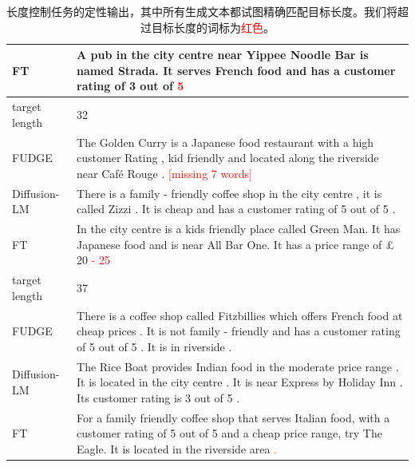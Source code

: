 \documentclass{article}
\newcommand\errorspan[1]{\textcolor{red}{#1}}
\begin{document}
\begin{table}
{\begin{tabular}{lp{13cm}}
FT &  A pub in the city centre near Yippee Noodle Bar is named Strada. It serves French food and has a customer rating of 3 out of \errorspan{ 5 }
\\
\toprule
target length &  32 \\
\midrule
FUDGE &  The Golden Curry is a Japanese food restaurant with a high customer Rating , kid friendly and located along the riverside near Café Rouge . \errorspan{[missing 7 words]}\\
Diffusion-LM &   There is a family - friendly coffee shop in the city centre , it is called Zizzi . It is cheap and has a customer rating of 5 out of 5 . \\
FT &  In the city centre is a kids friendly place called Green Man. It has Japanese food and is near All Bar One. It has a price range of £ 20 \errorspan{ - 25 }
\\
\toprule
target length &  37 \\
\midrule
FUDGE &  There is a coffee shop called Fitzbillies which offers French food at cheap prices . It is not family - friendly and has a customer rating of 5 out of 5 . It is in riverside . \\
Diffusion-LM &   The Rice Boat provides Indian food in the moderate price range . It is located in the city centre . It is near Express by Holiday Inn . Its customer rating is 3 out of 5 . \\
FT &  For a family friendly coffee shop that serves Italian food, with a customer rating of 5 out of 5 and a cheap price range, try The Eagle. It is located in the riverside area \errorspan{. }
\\
\bottomrule
\end{tabular}}
\caption{\label{app:qualitative-length} 长度控制任务的定性输出，其中所有生成文本都试图精确匹配目标长度。我们将超过目标长度的词标为\errorspan{红色}。}
\end{table}
\end{document}

